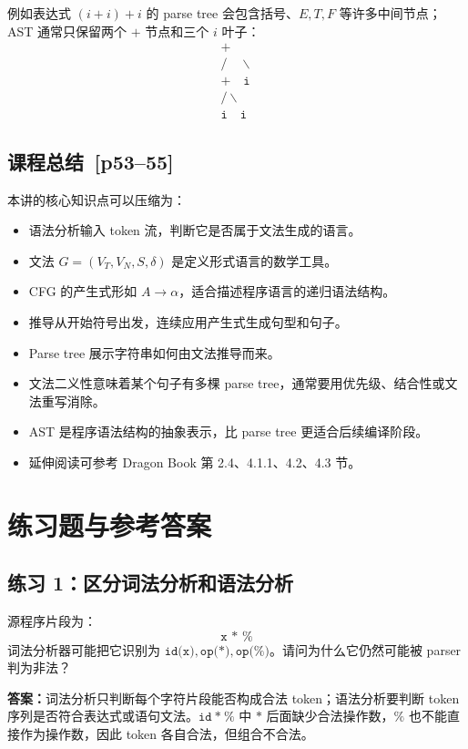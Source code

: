 \documentclass[UTF8,fontset=none,11pt]{ctexart}
\newcommand{\pg}[1]{\texorpdfstring{{\small\color{graytext}\,[p#1]}}{ [p#1]}}
\newcommand{\code}[1]{\texttt{#1}}
\begin{document}
例如表达式 \((i+i)+i\) 的 parse tree 会包含括号、\(E,T,F\) 等许多中间节点；AST 通常只保留两个 \(+\) 节点和三个 \(i\) 叶子：
\[
\begin{array}{c}
\texttt{+}\\[-2pt]
/ \quad \backslash\\[-2pt]
\texttt{+}\quad \texttt{i}\\[-2pt]
/ \backslash\\[-2pt]
\texttt{i}\quad \texttt{i}
\end{array}
\]

\subsection{课程总结 \pg{53--55}}
本讲的核心知识点可以压缩为：
\begin{itemize}
  \item 语法分析输入 token 流，判断它是否属于文法生成的语言。
  \item 文法 \(G=(V_T,V_N,S,\delta)\) 是定义形式语言的数学工具。
  \item CFG 的产生式形如 \(A\to\alpha\)，适合描述程序语言的递归语法结构。
  \item 推导从开始符号出发，连续应用产生式生成句型和句子。
  \item Parse tree 展示字符串如何由文法推导而来。
  \item 文法二义性意味着某个句子有多棵 parse tree，通常要用优先级、结合性或文法重写消除。
  \item AST 是程序语法结构的抽象表示，比 parse tree 更适合后续编译阶段。
  \item 延伸阅读可参考 Dragon Book 第 2.4、4.1.1、4.2、4.3 节。
\end{itemize}

\section{练习题与参考答案}

\subsection*{练习 1：区分词法分析和语法分析}
源程序片段为：
\[
\code{x * \%}
\]
词法分析器可能把它识别为 \(\code{id(x)},\code{op(*)},\code{op(\%)}\)。请问为什么它仍然可能被 parser 判为非法？

\textbf{答案：}词法分析只判断每个字符片段能否构成合法 token；语法分析要判断 token 序列是否符合表达式或语句文法。\(\code{id}\ \code{*}\ \code{\%}\) 中 \(\code{*}\) 后面缺少合法操作数，\(\code{\%}\) 也不能直接作为操作数，因此 token 各自合法，但组合不合法。
\end{document}
